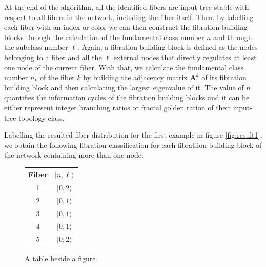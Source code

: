 \documentclass[12pt]{diazessay} %
\begin{document}
At the end of the algorithm, all the identified fibers are input-tree stable with respect to all fibers in the network, including the fiber itself. Then, by labelling each fiber with an index or color we can then construct the fibration building blocks through the calculation of the fundamental class number $n$ and through the subclass number $\ell$. Again, a fibration building block is defined as the nodes belonging to a fiber and all the $\ell$ external nodes that directly regulates at least one node of the current fiber. With that, we calculate the fundamental class number $n_k$ of the fiber $k$ by building the adjacency matrix $\mathbf{A}^{k}$ of its fibration building block and then calculating the largest eigenvalue of it. The value of $n$ quantifies the information cycles of the fibration building blocks and it can be either represent integer branching ratios or fractal golden ration of their input-tree topology class.

Labelling the resulted fiber distribution for the first example in figure \ref{fig:result1}, we obtain the following fibration classification for each fibratiion building block of the network containing more than one node:

\begin{figure}[!ht]
    \centering
    \qquad
    \begin{tabular}[b]{cc}\hline
      Fiber & $| n, \ell \rangle$  \\ \hline
      1 & $| 0, 2 \rangle$ \\
      2 & $| 0, 1 \rangle$ \\
      3 & $| 0, 1 \rangle$ \\ 
      4 & $| 0, 1 \rangle$ \\
      5 & $| 0, 2 \rangle$ \\ \hline
	\end{tabular}
    \caption{A table beside a figure}
\end{figure}
\end{document}

